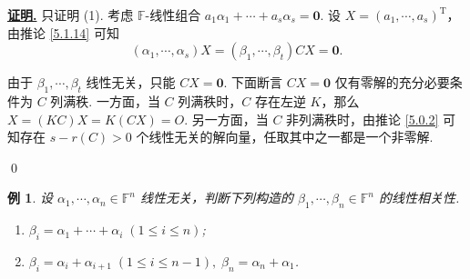 \documentclass[10pt,openany]{article}
\theoremstyle{thmstyle} %
\theoremstyle{defstyle} %
\theoremstyle{prostyle} %
\theoremstyle{exastyle}
\newtheorem{example}[theorem]{例}
\theoremstyle{remstyle}
\renewenvironment{proof}[1][证明]{\par\underline{\textbf{#1.}} \;\fangsong}{\qed\par}
\newcommand{\T}{^{\text{T}}}
\newcommand{\F}{\mathbb{F}}
\begin{document}
\begin{proof}
	只证明 (1). 考虑 \( \F\)-线性组合 \( a_1\alpha_1+\cdots+a_s\alpha_s=\bm{0} \). 设 \( X=(a_1,\cdots,a_s)\T \)，由推论 \ref{5.1.14} 可知
	\[ (\alpha_1,\cdots,\alpha_s)X=(\beta_1,\cdots,\beta_t)CX=\bm{0}. \]
	
	由于 \( \beta_1,\cdots,\beta_t \) 线性无关，只能 \( CX=\bm{0} \). 下面断言 \( CX=\bm{0} \) 仅有零解的充分必要条件为 \( C \) 列满秩. 一方面，当 \( C \) 列满秩时，\( C \) 存在左逆 \( K \)，那么 \( X=(KC)X=K(CX)=O \). 另一方面，当 \( C \) 非列满秩时，由推论 \ref{5.0.2} 可知存在 \( s-r(C)>0 \) 个线性无关的解向量，任取其中之一都是一个非零解.
	 
\end{proof}


\begin{example} \label{5.1.16}
	设 \( \alpha_1,\cdots,\alpha_n \in \F^n \) 线性无关，判断下列构造的 \( \beta_1,\cdots,\beta_n \in \F^n \) 的线性相关性.
	\begin{enumerate}[(1)]
		\item \( \beta_i=\alpha_1+\cdots+\alpha_i \; (1 \leq i \leq n) \);
		\item \( \beta_i=\alpha_i+\alpha_{i+1} \; (1 \leq i \leq n-1), \; \beta_n=\alpha_n+\alpha_1 \).
	\end{enumerate}
\end{example}
\end{document}
